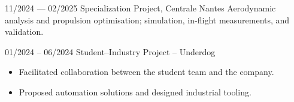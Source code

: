 

        {11/2024 — 02/2025}
        {Specialization Project, Centrale Nantes}
        {%
        Aerodynamic analysis and propulsion optimisation; simulation, in-flight measurements, and validation.
        }

        {01/2024 -- 06/2024}
        {Student--Industry Project -- Underdog}
        {%
          \begin{itemize}
            \item Facilitated collaboration between the student team and the company.
            \item Proposed automation solutions and designed industrial tooling.
          \end{itemize}
        }
